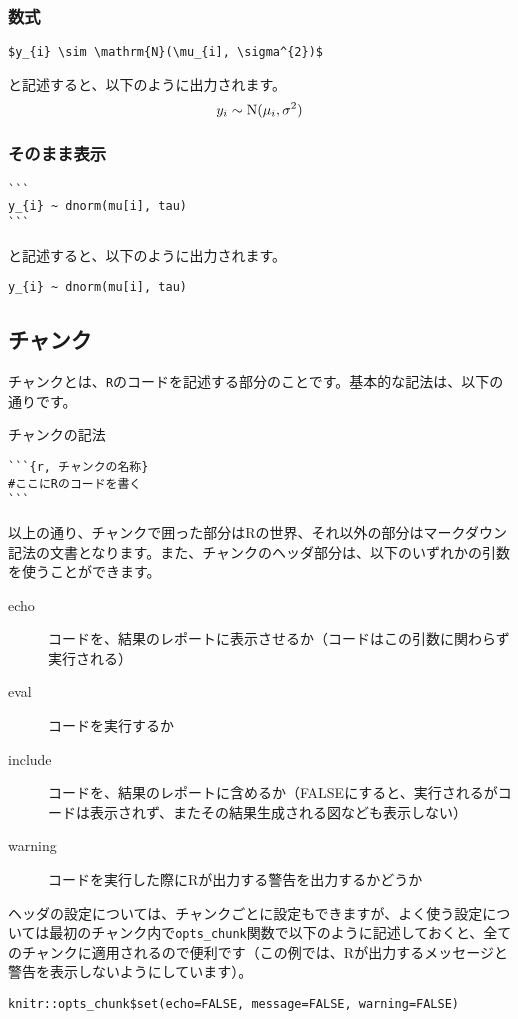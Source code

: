     \subsubsection{数式}
\begin{verbatim}
$y_{i} \sim \mathrm{N}(\mu_{i], \sigma^{2})$
\end{verbatim}
と記述すると、以下のように出力されます。
\begin{equation}
y_{i} \sim \mathrm{N}(\mu_{i}, \sigma^{2}) \notag
\end{equation}

    \subsubsection{そのまま表示}
\begin{verbatim}
```
y_{i} ~ dnorm(mu[i], tau)
```
\end{verbatim}
と記述すると、以下のように出力されます。
\begin{verbatim}
y_{i} ~ dnorm(mu[i], tau)
\end{verbatim}

  \subsection{チャンク}
チャンクとは、\verb|R|のコードを記述する部分のことです。基本的な記法は、以下の通りです。
\begin{itembox}[l]{チャンクの記法}
\begin{verbatim}
```{r, チャンクの名称}
#ここにRのコードを書く
```
\end{verbatim}
\end{itembox}
以上の通り、チャンクで囲った部分はRの世界、それ以外の部分はマークダウン記法の文書となります。また、チャンクのヘッダ部分は、以下のいずれかの引数を使うことができます。

\begin{description}
  \item[echo]コードを、結果のレポートに表示させるか（コードはこの引数に関わらず実行される）
  \item[eval]コードを実行するか
  \item[include]コードを、結果のレポートに含めるか（FALSEにすると、実行されるがコードは表示されず、またその結果生成される図なども表示しない）
  \item[warning]コードを実行した際にRが出力する警告を出力するかどうか
\end{description}

ヘッダの設定については、チャンクごとに設定もできますが、よく使う設定については最初のチャンク内で\texttt{opts\_chunk}関数で以下のように記述しておくと、全てのチャンクに適用されるので便利です（この例では、Rが出力するメッセージと警告を表示しないようにしています）。
\begin{verbatim}
knitr::opts_chunk$set(echo=FALSE, message=FALSE, warning=FALSE)
\end{verbatim}

